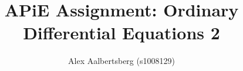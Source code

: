 \documentclass[12pt, a4paper]{article}
\begin{document}
	\author{Alex Aalbertsberg (s1008129)}	
	\title{APiE Assignment: Ordinary Differential Equations 2}
	\maketitle
\end{document}
